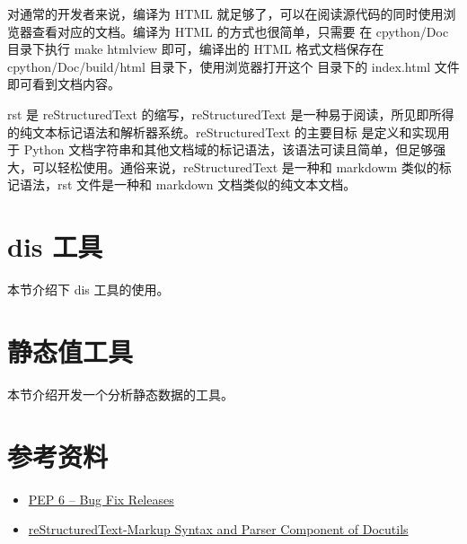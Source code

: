 对通常的开发者来说，编译为 HTML 就足够了，可以在阅读源代码的同时使用浏览器查看对应的文档。编译为 HTML 的方式也很简单，只需要
在 cpython/Doc 目录下执行 make htmlview 即可，编译出的 HTML 格式文档保存在 cpython/Doc/build/html 目录下，使用浏览器打开这个
目录下的 index.html 文件即可看到文档内容。

\begin{definition}[rst 文件] \label{def:int}
rst 是 reStructuredText 的缩写，reStructuredText 是一种易于阅读，所见即所得的纯文本标记语法和解析器系统。reStructuredText 的主要目标
是定义和实现用于 Python 文档字符串和其他文档域的标记语法，该语法可读且简单，但足够强大，可以轻松使用。通俗来说，reStructuredText
 是一种和 markdowm 类似的标记语法，rst 文件是一种和 markdown 文档类似的纯文本文档。
\end{definition}

\section{dis 工具}

本节介绍下 dis 工具的使用。

\section{静态值工具}

本节介绍开发一个分析静态数据的工具。

\section{参考资料}

\begin{itemize}
\item \href{https://peps.python.org/pep-0006/}{PEP 6 – Bug Fix Releases}
\item \href{https://docutils.sourceforge.io/rst.html}{reStructuredText-Markup Syntax and Parser Component of Docutils}
\end{itemize}
